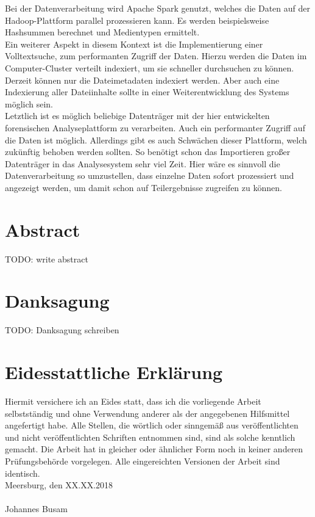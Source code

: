 \noindent
Bei der Datenverarbeitung wird Apache Spark genutzt, welches die Daten auf der Hadoop-Plattform parallel prozessieren kann. Es werden beispielsweise Hashsummen berechnet und Medientypen ermittelt.\\
Ein weiterer Aspekt in diesem Kontext ist die Implementierung einer Volltextsuche, zum performanten Zugriff der Daten. Hierzu werden die Daten im Computer-Cluster verteilt indexiert, um sie schneller durchsuchen zu können. Derzeit können nur die Dateimetadaten indexiert werden. Aber auch eine Indexierung aller Dateiinhalte sollte in einer Weiterentwicklung des Systems möglich sein.\\

\noindent
Letztlich ist es möglich beliebige Datenträger mit der hier entwickelten forensischen Analyseplattform zu verarbeiten. Auch ein performanter Zugriff auf die Daten ist möglich. Allerdings gibt es auch Schwächen dieser Plattform, welch zukünftig behoben werden sollten. So benötigt schon das Importieren großer Datenträger in das Analysesystem sehr viel Zeit. Hier wäre es sinnvoll die Datenverarbeitung so umzustellen, dass einzelne Daten sofort prozessiert und angezeigt werden, um damit schon auf Teilergebnisse zugreifen zu können.


\newpage
\section*{Abstract}
TODO: write abstract
\newpage

\section*{Danksagung}
TODO: Danksagung schreiben
\newpage

\section*{Eidesstattliche Erklärung}

Hiermit versichere ich an Eides statt, dass ich die vorliegende Arbeit selbstständig und
ohne Verwendung anderer als der angegebenen Hilfsmittel angefertigt habe. Alle Stellen,
die wörtlich oder sinngemäß aus veröffentlichten und nicht veröffentlichten Schriften
entnommen sind, sind als solche kenntlich gemacht. Die Arbeit hat in gleicher oder
ähnlicher Form noch in keiner anderen Prüfungsbehörde vorgelegen. Alle eingereichten
Versionen der Arbeit sind identisch.\\
\newline
\noindent
Meersburg, den XX.XX.2018 \\
\vspace{1.5cm} \\
Johannes Busam\newline

\newpage
